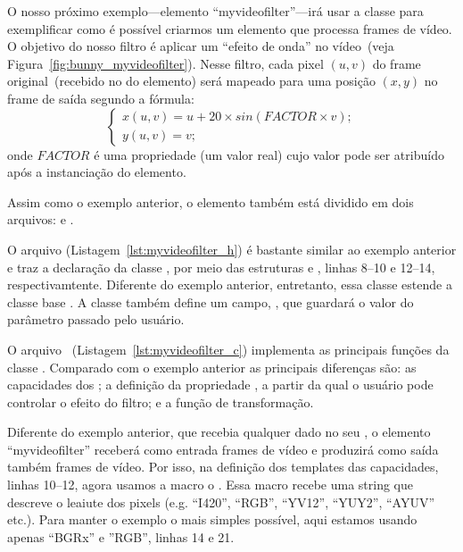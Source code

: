 O nosso próximo exemplo---elemento ``myvideofilter''---irá usar a classe
 para exemplificar como é possível criarmos um elemento que
processa frames de vídeo.  O objetivo do nosso filtro é aplicar um ``efeito de
onda'' no vídeo~(veja Figura~\ref{fig:bunny_myvideofilter}).  Nesse filtro,
cada pixel $(u, v)$ do frame original~(recebido no  do elemento)
será mapeado para uma posição $(x, y)$ no frame de saída segundo a fórmula:
\begin{equation}
  \begin{cases}
  x(u, v) = u + 20 \times sin ( FACTOR \times v); \\
  y(u, v) = v;
  \end{cases}
  \label{eq:wave_filter}
\end{equation}
onde $FACTOR$ é uma propriedade (um valor real) cujo valor pode ser atribuído
após a instanciação do elemento.

Assim como o exemplo anterior, o elemento  também está
dividido em dois arquivos:  e .

O arquivo  (Listagem~\ref{lst:myvideofilter_h}) é bastante
similar ao exemplo anterior e traz a declaração da classe ,
por meio das estruturas  e ,
linhas 8--10 e 12--14, respectivamtente.  Diferente do exemplo anterior,
entretanto, essa classe estende a classe base .  A classe
 também define um campo, , que guardará o valor do
parâmetro passado pelo usuário.



O arquivo ~(Listagem~\ref{lst:myvideofilter_c}) implementa
as principais funções da classe .  Comparado com o exemplo
anterior as principais diferenças são: as capacidades dos ; a
definição da propriedade , a partir da qual o usuário pode controlar 
o efeito do filtro; e a função de transformação.



Diferente do exemplo anterior, que recebia qualquer dado no seu ,
o elemento ``myvideofilter'' receberá como entrada frames de vídeo e produzirá
como saída também frames de vídeo.  Por isso, na definição dos templates das
capacidades, linhas 10--12, agora usamos a macro o .
Essa macro recebe uma string que descreve o leaiute dos pixels (e.g. ``I420'',
``RGB'', ``YV12'', ``YUY2'', ``AYUV'' etc.).  Para manter o exemplo o mais
simples possível, aqui estamos usando apenas ``BGRx'' e ''RGB'', linhas 14 e
21.


